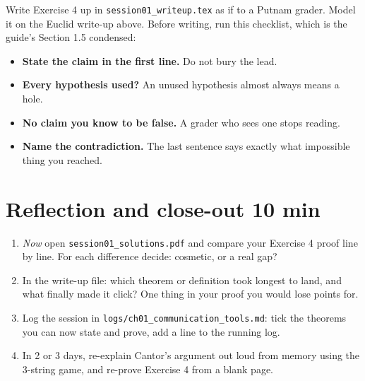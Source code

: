 \documentclass[11pt]{article}
\theoremstyle{plain}
\theoremstyle{definition}
\begin{document}
Write Exercise 4 up in \texttt{session01\_writeup.tex} as if to a Putnam grader. Model it on the Euclid write-up above. Before writing, run this checklist, which is the guide's Section 1.5 condensed:
\begin{itemize}
  \item[\checkbox] \textbf{State the claim in the first line.} Do not bury the lead.
  \item[\checkbox] \textbf{Every hypothesis used?} An unused hypothesis almost always means a hole.
  \item[\checkbox] \textbf{No claim you know to be false.} A grader who sees one stops reading.
  \item[\checkbox] \textbf{Name the contradiction.} The last sentence says exactly what impossible thing you reached.
\end{itemize}

\section{Reflection and close-out \hfill 10 min}
\begin{enumerate}
  \item \emph{Now} open \texttt{session01\_solutions.pdf} and compare your Exercise 4 proof line by line. For each difference decide: cosmetic, or a real gap?
  \item In the write-up file: which theorem or definition took longest to land, and what finally made it click? One thing in your proof you would lose points for.
  \item Log the session in \texttt{logs/ch01\_communication\_tools.md}: tick the theorems you can now state and prove, add a line to the running log.
  \item In 2 or 3 days, re-explain Cantor's argument out loud from memory using the 3-string game, and re-prove Exercise 4 from a blank page.
\end{enumerate}
\end{document}
